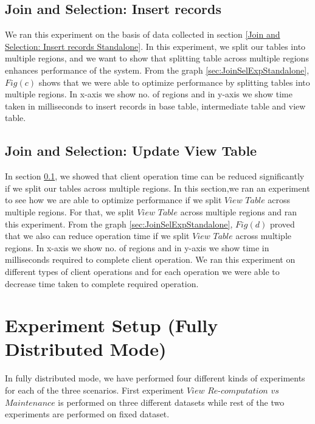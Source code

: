 \documentclass[11pt,a4paper,bibtotoc,idxtotoc,headsepline,footsepline,footexclude,BCOR12mm,DIV13]{scrbook}
\begin{document}
\subsection{Join and Selection: Insert records}
\label{Join and Selection: Insert Records Standalone}
We ran this experiment on the basis of data collected in section \ref{Join and Selection: Insert records Standalone}. In this experiment, we split our tables into multiple regions, and we want to show that splitting table across multiple regions enhances performance of the system. From the graph \ref{sec:JoinSelExpStandalone}, $Fig(c)$ shows that we were able to optimize performance by splitting tables into multiple regions. In x-axis we show no. of regions and in y-axis we show time taken in milliseconds to insert records in base table, intermediate table and view table.

\subsection{Join and Selection: Update View Table} 
\label{Join and Sel: Update View Table Standalone}
In section \ref{Join and Selection: Insert Records Standalone}, we showed that client operation time can be reduced significantly if we split our tables across multiple regions. In this section,we ran an experiment to see how we are able to optimize performance if we split $View$ $Table$ across multiple regions. For that, we split $View$ $Table$ across multiple regions and ran this experiment. From the graph \ref{sec:JoinSelExpStandalone}, $Fig(d)$ proved that we also can reduce operation time if we split $View$ $Table$ across multiple regions. In x-axis we show no. of regions and in y-axis we show time in milliseconds required to complete client operation. We ran this experiment on different types of client operations and for each operation we were able to decrease time taken to complete required operation. 

\section{Experiment Setup (Fully Distributed Mode)}
In fully distributed mode, we have performed four different kinds of experiments for each of the three scenarios. First experiment $View$ $Re$-$computation$ $vs$ $Maintenance$ is performed on three different datasets while rest of the two experiments are performed on fixed dataset.
\end{document}
